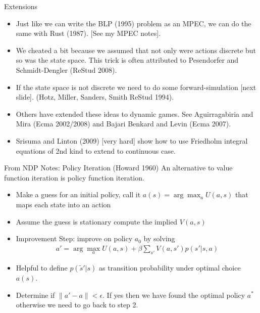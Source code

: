 \documentclass[xcolor=pdftex,dvipsnames,table,mathserif,aspectratio=169]{beamer}
\begin{document}
\begin{frame}{Extensions}
\begin{itemize}
\item Just like we can write the BLP (1995) problem as an \alert{MPEC}, we can do the same with Rust (1987). [See my MPEC notes].
\item We cheated a bit because we assumed that not only were actions discrete but so was the state space. This trick is often attributed to Pesendorfer and Schmidt-Dengler (ReStud 2008).
\item If the state space is not discrete we need to do some forward-simulation [next slide]. (Hotz, Miller, Sanders, Smith ReStud 1994).
\item Others have extended these ideas to \alert{dynamic games}. See Aguirragabiria and Mira (Ecma 2002/2008) and Bajari Benkard and Levin (Ecma 2007).
\item Srisuma and Linton (2009) [very hard] show how to use Friedholm integral equations of 2nd kind to extend to continuous case.
\end{itemize}
\end{frame}


\begin{frame}{From NDP Notes: Policy Iteration (Howard 1960)}
An alternative to value function iteration is policy function iteration. 
\begin{itemize}
\item Make a guess for an initial policy, call it $a(s) = \arg \max_a U(a,s)$ that maps each state into an action
\item Assume the guess is stationary compute the implied $V(a,s)$
\item Improvement Step: improve on policy $a_0$ by solving 
\begin{eqnarray*}
a' = \arg \max_a U(a,s) + \beta \sum_{s'} V(a,s') p(s' | s,a)
\end{eqnarray*}
\item Helpful to define $p(\tilde{s}' | s)$ as transition probability under optimal choice $a(s)$.
\item Determine if $\| a' -a\| < \epsilon$. If yes then we have found the optimal policy $a^* $ otherwise we need to go back to step 2.
\end{itemize}
\end{frame}
\end{document}
